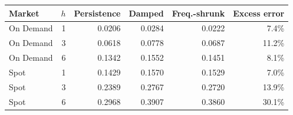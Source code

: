 \begin{tabular}{lrrrrr}
\toprule
Market & $h$ & Persistence & Damped & Freq.-shrunk & Excess error \\
\midrule
On Demand & 1 & 0.0206 & 0.0284 & 0.0222 & 7.4\% \\
On Demand & 3 & 0.0618 & 0.0778 & 0.0687 & 11.2\% \\
On Demand & 6 & 0.1342 & 0.1552 & 0.1451 & 8.1\% \\
Spot & 1 & 0.1429 & 0.1570 & 0.1529 & 7.0\% \\
Spot & 3 & 0.2389 & 0.2767 & 0.2720 & 13.9\% \\
Spot & 6 & 0.2968 & 0.3907 & 0.3860 & 30.1\% \\
\bottomrule
\end{tabular}
